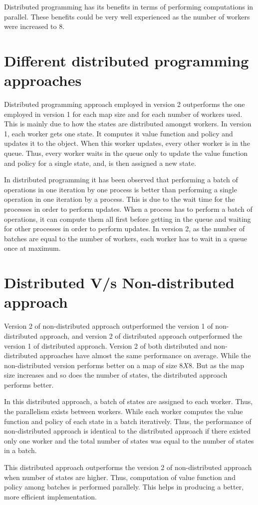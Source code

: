 \documentclass[11pt]{article}
\begin{document}
Distributed programming has its benefits in terms of performing computations in parallel. These benefits could be very well experienced as the number of workers were increased to 8.

\section{Different distributed programming approaches}
\label{section:dist}

Distributed programming approach employed in version 2 outperforms the one employed in version 1 for each map size and for each number of workers used. This is mainly due to how the states are distributed amongst workers. In version 1, each worker gets one state. It computes it value function and policy and updates it to the object. When this worker updates, every other worker is in the queue. Thus, every worker waits in the queue only to update the value function and policy for a single state, and, is then assigned a new state.

In distributed programming it has been observed that performing a batch of operations in one iteration by one process is better than performing a single operation in one iteration by a process. This is due to the wait time for the processes in order to perform updates. When a process has to perform a batch of operations, it can compute them all first before getting in the queue and waiting for other processes in order to perform updates. In version 2, as the number of batches are equal to the number of workers, each worker has to wait in a queue once at maximum.


\section{Distributed V/s Non-distributed approach}
\label{section:approach}



Version 2 of non-distributed approach outperformed the version 1 of non-distributed approach, and version 2 of distributed approach outperformed the version 1 of distributed approach. Version 2 of both distributed and non-distributed approaches have almost the same performance on average. While the non-distributed version performs better on a map of size $8 X 8$. But as the map size increases and so does the number of states, the distributed approach performs better.

In this distributed approach, a batch of states are assigned to each worker. Thus, the parallelism exists between workers. While each worker computes the value function and policy of each state in a batch iteratively. Thus, the performance of non-distributed approach is identical to the distributed approach if there existed only one worker and the total number of states was equal to the number of states in a batch.

This distributed approach outperforms the version 2 of non-distributed approach when number of states are higher. Thus, computation of value function and policy among batches is performed parallely. This helps in producing a better, more efficient implementation.
\end{document}
